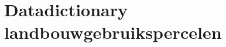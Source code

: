 \section{Datadictionary landbouwgebruikspercelen}
\label{app:datadictionary}

\setlength{\LTpre}{0pt}
\setlength{\LTpost}{0pt}

